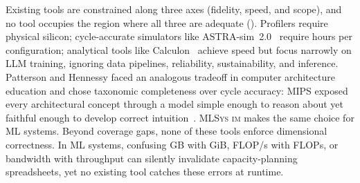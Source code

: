\documentclass[10pt,twocolumn]{article}
\newcommand{\mlsysim}{\mbox{\textsc{MLSys}\,\textperiodcentered\,\textsc{im}}\xspace}
\begin{document}
Existing tools are constrained along three axes (fidelity, speed, and scope), and no tool occupies the region where all three are adequate (). Profilers require physical silicon; cycle-accurate simulators like ASTRA-sim~2.0~\citep{won2023} require hours per configuration; analytical tools like Calculon~\citep{isaev2023} achieve speed but focus narrowly on LLM training, ignoring data pipelines, reliability, sustainability, and inference. Patterson and Hennessy faced an analogous tradeoff in computer architecture education and chose taxonomic completeness over cycle accuracy: MIPS exposed every architectural concept through a model simple enough to reason about yet faithful enough to develop correct intuition~\citep{hennessy2024architecture}. \mlsysim makes the same choice for ML systems. Beyond coverage gaps, none of these tools enforce dimensional correctness. In ML systems, confusing GB with GiB, FLOP/s with FLOPs, or bandwidth with throughput can silently invalidate capacity-planning spreadsheets, yet no existing tool catches these errors at runtime.
\end{document}
